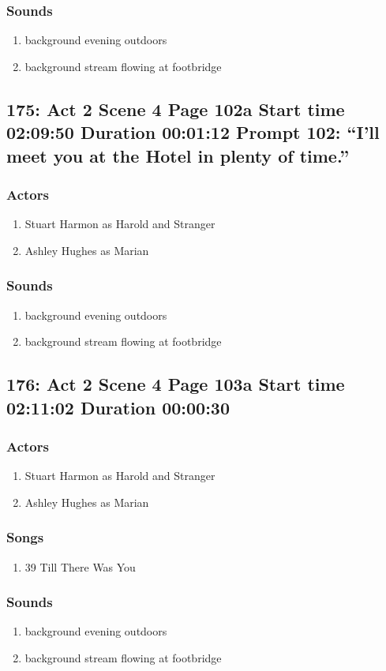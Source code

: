 \subsubsection{Sounds}
\begin{enumerate}
\item background evening outdoors
\item background stream flowing at footbridge
\end{enumerate}
\subsection{175: Act 2 Scene 4 Page 102a Start time 02:09:50 Duration 00:01:12 Prompt 102: ``I'll meet you at the Hotel in plenty of time.''}

\subsubsection{Actors}
\begin{enumerate}
\item Stuart Harmon as Harold and Stranger
\item Ashley Hughes as Marian
\end{enumerate}

\subsubsection{Sounds}
\begin{enumerate}
\item background evening outdoors
\item background stream flowing at footbridge
\end{enumerate}
\subsection{176: Act 2 Scene 4 Page 103a Start time 02:11:02 Duration 00:00:30}

\subsubsection{Actors}
\begin{enumerate}
\item Stuart Harmon as Harold and Stranger
\item Ashley Hughes as Marian
\end{enumerate}

\subsubsection{Songs}
\begin{enumerate}
\item 39 Till There Was You
\end{enumerate}\subsubsection{Sounds}
\begin{enumerate}
\item background evening outdoors
\item background stream flowing at footbridge
\end{enumerate}
